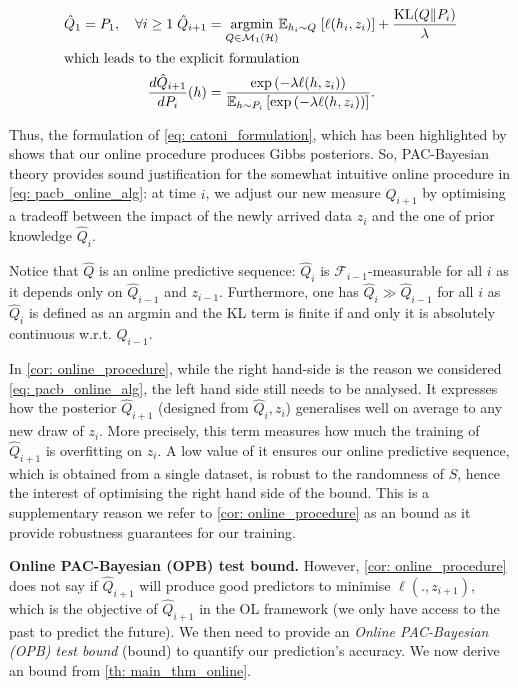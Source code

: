 \begin{align}
  \label{eq: pacb_online_alg}
  \hat{Q}_1= P_1, \quad \forall i\geq1\; \hat{Q}_{i+1}&= \underset{Q\in\mathcal{M}_1(\mathcal{H})}{\mathrm{argmin}} \mathbb{E}_{h_i\sim Q} \; [\ell(h_i,z_i)] + \frac{\operatorname{KL}(Q\| P_i)}{\lambda} \\
  \intertext{which leads to the explicit formulation}
  \label{eq: catoni_formulation}
  \frac{d\hat{Q}_{i+1}}{dP_i}(h)& = \frac{\exp\left(-\lambda \ell(h,z_i)\right)}{\mathbb{E}_{h\sim P_i}\left[\exp\left(-\lambda \ell(h,z_i)\right)\right]}.
\end{align}

  Thus, the formulation of \cref{eq: catoni_formulation}, which has been highlighted by \citet[Sec. 5.1]{catoni2003pac} shows that our online procedure produces Gibbs posteriors.
 So, PAC-Bayesian theory provides sound justification for the somewhat intuitive online procedure in \cref{eq: pacb_online_alg}: at time $i$, we adjust our new measure $\hat{Q}_{i+1}$ by optimising a tradeoff between the impact of the newly arrived data $z_i$ and the one of prior knowledge $\hat{Q}_i$.


 Notice that $\hat{Q}$ is an online predictive sequence: $\hat{Q}_i$ is $\mathcal{F}_{i-1}$-measurable for all $i$ as it depends only on $\hat{Q}_{i-1}$ and $z_{i-1}$. Furthermore, one has $\hat{Q}_{i} \gg \hat{Q}_{i-1}$ for all $i$ as $\hat{Q}_{i}$ is defined as an argmin and the KL term is finite if and only it is absolutely continuous w.r.t. $\hat{Q}_{i-1}$.


\begin{remark}
  In \cref{cor: online_procedure}, while the right hand-side is the reason we considered \cref{eq: pacb_online_alg}, the left hand side still needs to be analysed. It expresses how the posterior $\hat{Q}_{i+1}$ (designed from $\hat{Q}_i,z_i$) generalises well on average to any new draw of $z_i$. More precisely, this term measures how much the training of $\hat{Q}_{i+1}$ is overfitting on $z_i$. A low value of it ensures our online predictive sequence, which is obtained from a single dataset, is robust to the randomness of $S$, hence the interest of optimising the right hand side of the bound.
  This is a supplementary reason we refer to \cref{cor: online_procedure} as an \OPBTrain bound as it provide robustness guarantees for our training.
\end{remark}



\textbf{Online PAC-Bayesian (OPB) test bound.}
However, \cref{cor: online_procedure} does not say if $\hat{Q}_{i+1}$ will produce good predictors to minimise $\ell(.,z_{i+1})$, which is the objective of $\hat{Q}_{i+1}$ in the OL framework (we only have access to the past to predict the future). We then need to provide an \emph{Online PAC-Bayesian (OPB) test bound} (\OPBTest bound) to quantify our prediction's accuracy. We now derive an \OPBTest bound from \cref{th: main_thm_online}.

